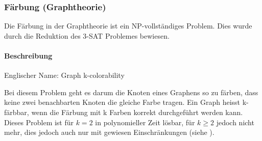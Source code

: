 	\subsubsection{Färbung (Graphtheorie)}\label{colarability_graph_theory}
	Die Färbung in der Graphtheorie ist ein NP-vollständiges Problem. Dies wurde durch die Reduktion des 3-SAT Problemes bewiesen.

	\paragraph{Beschreibung}
	Englischer Name: Graph k-colorability

	Bei diesem Problem geht es darum die Knoten eines Graphens so zu färben, dass keine zwei benachbarten Knoten die gleiche Farbe tragen. Ein Graph heisst k-färbbar, wenn die 
Färbung mit k Farben korrekt durchgeführt werden kann. Dieses Problem ist für $k = 2$ in polynomieller Zeit lösbar, für $k \ge 2$ jedoch nicht mehr, dies jedoch auch nur mit gewiesen 
Einschränkungen (siehe \cite{garey1979computers}).

